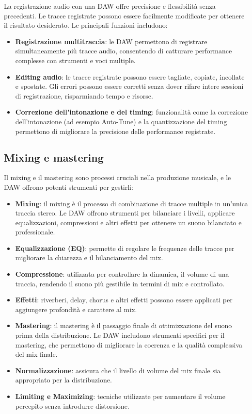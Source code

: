 \documentclass{book}
\begin{document}
La registrazione audio con una DAW offre precisione e flessibilità senza precedenti. Le tracce registrate possono essere facilmente modificate per ottenere il risultato desiderato. Le principali funzioni includono:

\begin{itemize}
\item \textbf{Registrazione multitraccia}: le DAW permettono di registrare simultaneamente più tracce audio, consentendo di catturare performance complesse con strumenti e voci multiple.
\item \textbf{Editing audio}: le tracce registrate possono essere tagliate, copiate, incollate e spostate. Gli errori possono essere corretti senza dover rifare intere sessioni di registrazione, risparmiando tempo e risorse.
\item \textbf{Correzione dell’intonazione e del timing}: funzionalità come la correzione dell’intonazione (ad esempio Auto-Tune) e la quantizzazione del timing permettono di migliorare la precisione delle performance registrate.
\end{itemize}

\subsection{Mixing e mastering}

Il mixing e il mastering sono processi cruciali nella produzione musicale, e le DAW offrono potenti strumenti per gestirli:

\begin{itemize}
\item \textbf{Mixing}: il mixing è il processo di combinazione di tracce multiple in un’unica traccia stereo. Le DAW offrono strumenti per bilanciare i livelli, applicare equalizzazioni, compressioni e altri effetti per ottenere un suono bilanciato e professionale.
\item \textbf{Equalizzazione (EQ)}: permette di regolare le frequenze delle tracce per migliorare la chiarezza e il bilanciamento del mix.
\item \textbf{Compressione}: utilizzata per controllare la dinamica, il volume di una traccia, rendendo il suono più gestibile in termini di mix e controllato.
\item \textbf{Effetti}: riverberi, delay, chorus e altri effetti possono essere applicati per aggiungere profondità e carattere al mix.
\item \textbf{Mastering}: il mastering è il passaggio finale di ottimizzazione del suono prima della distribuzione. Le DAW includono strumenti specifici per il mastering, che permettono di migliorare la coerenza e la qualità complessiva del mix finale.
\item \textbf{Normalizzazione}: assicura che il livello di volume del mix finale sia appropriato per la distribuzione.
\item \textbf{Limiting e Maximizing}: tecniche utilizzate per aumentare il volume percepito senza introdurre distorsione.
\end{itemize}
\end{document}
